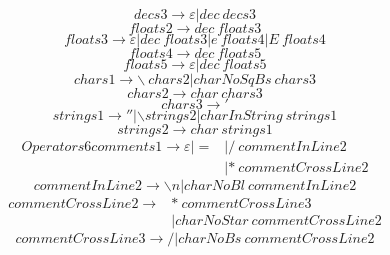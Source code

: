 \documentclass[UTF8]{ctexart}
\begin{document}
\begin{equation}
	decs3 \rightarrow \varepsilon | dec \ decs3
\end{equation}
\begin{equation}
	floats2 \rightarrow dec \ floats3
\end{equation}
\begin{equation}
	floats3 \rightarrow \varepsilon | dec \ floats3 | e \ floats4 | E \ floats4
\end{equation}
\begin{equation}
	floats4 \rightarrow dec \ floats5
\end{equation}
\begin{equation}
	floats5 \rightarrow \varepsilon | dec \ floats5
\end{equation}
\begin{equation}
	chars1 \rightarrow \backslash \ chars2 | charNoSqBs \ chars3
\end{equation}
\begin{equation}
	chars2 \rightarrow char \ chars3
\end{equation}
\begin{equation}
	chars3 \rightarrow '
\end{equation}
\begin{equation}
	strings1 \rightarrow '' | \backslash strings2 | charInString \ strings1
\end{equation}
\begin{equation}
	strings2 \rightarrow char \ strings1
\end{equation}
\begin{equation}
	\begin{aligned}
		Operators6comments1 \rightarrow \varepsilon | = & | / \ commentInLine2   \\
		                                                & |* \ commentCrossLine2
	\end{aligned}
\end{equation}
\begin{equation}
	commentInLine2 \rightarrow \backslash n | charNoBl \ commentInLine2
\end{equation}
\begin{equation}
	\begin{aligned}
		commentCrossLine2 \rightarrow & * \ commentCrossLine3            \\
		                              & | charNoStar \ commentCrossLine2
	\end{aligned}
\end{equation}
\begin{equation}
	commentCrossLine3 \rightarrow / | charNoBs \ commentCrossLine2
\end{equation}
\end{document}
